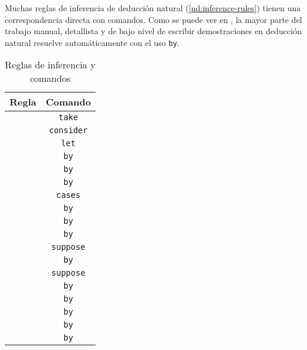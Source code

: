 Muchas reglas de inferencia de deducción natural (\ref{nd:inference-rules})
tienen una correspondencia directa con comandos. Como se puede ver en
, la mayor parte del trabajo
manual, detallista y de bajo nivel de escribir demostraciones en deducción
natural resuelve automáticamente con el uso \lstinline{by}.
\begin{table}[H]
    \centering
    \begin{tabular}{c|c}
    Regla & Comando \\
    \hline
        &   \lstinline|take| \\
        &   \lstinline|consider| \\
        &   \lstinline|let| \\
        &   \lstinline|by| \\
         &   \lstinline|by| \\
         &   \lstinline|by| \\
            &   \lstinline|cases| \\
           &   \lstinline|by| \\
        &   \lstinline|by| \\
        &   \lstinline|by| \\
           &   \lstinline|suppose| \\
           &   \lstinline|by| \\
           &   \lstinline|suppose| \\
           &   \lstinline|by| \\
          &   \lstinline|by| \\
         &   \lstinline|by| \\
            &   \lstinline|by| \\
             &   \lstinline|by|
    \end{tabular}
    \caption{Reglas de inferencia y comandos}
    \label{ppa:tab:inference-rules-to-commands}
\end{table}


